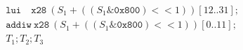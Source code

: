 \begin{align*}
  &\texttt{lui  }\ \ \ 
    \texttt{x28}\ 
    (S_1 + ((S_1 \& \texttt{0x800}) << 1))[12..31];\\
  &\texttt{addiw}\ 
    \texttt{x28}\ 
    (S_1 + ((S_1 \& \texttt{0x800}) << 1))[0..11];\\
  &T_1; T_2; T_3 
\end{align*}
